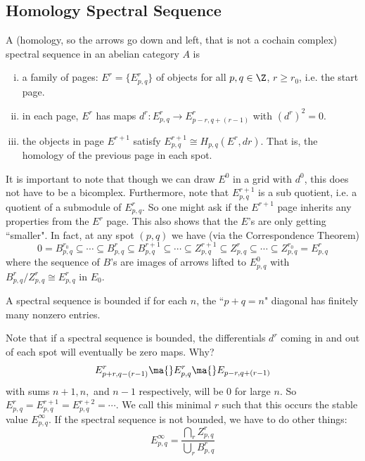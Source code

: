\subsection{Homology Spectral Sequence}

\begin{dfn}
A (homology, so the arrows go down and left, that is not a cochain complex) spectral sequence in an abelian category $A$ is 
\begin{enumerate}[(i)]
\item a family of pages: $E^r=\{E_{p,q}^r\}$ of objects for all $p,q \in \Z$, $r \geq r_0$, i.e. the start page.
\item in each page, $E^r$ has maps $d^r: E_{p,q}^r \to E_{p-r,q+(r-1)}^r$ with $(d^r)^2=0$.
\item the objects in page $E^{r+1}$ satisfy $E^{r+1}_{p,q} \cong H_{p,q}(E^r,dr)$. That is, the homology of the previous page in each spot. 
\end{enumerate}
\end{dfn}

It is important to note that though we can draw $E^0$ in a grid with $d^0$, this does not have to be a bicomplex. Furthermore, note that $E^{r+1}_{p,q}$ is a sub quotient, i.e. a quotient of a submodule of $E^r_{p,q}$. So one might ask if the $E^{r+1}$ page inherits any properties from the $E^r$ page. This also shows that the $E$'s are only getting ``smaller". In fact, at any spot $(p,q)$ we have (via the Correspondence Theorem)
\[
0=B^{r_0}_{p,q} \subseteq \cdots \subseteq B^r_{p,q} \subseteq B^{r+1}_{p,q} \subseteq \cdots \subseteq Z_{p,q}^{r+1} \subseteq Z^r_{p,q} \subseteq \cdots \subseteq Z_{p,q}^{r_0} = E_{p,q}^r
\]
where the sequence of $B$'s are images of arrows lifted to $E_{p,q}^0$ with $B^r_{p,q}/Z_{p,q}^r \cong E_{p,q}^r$ in $E_0$.

\begin{dfn}
A spectral sequence is bounded if for each $n$, the ``$p+q=n$" diagonal has finitely many nonzero entries. 
\end{dfn}

Note that if a spectral sequence is bounded, the differentials $d^r$ coming in and out of each spot will eventually be zero maps. Why?
\[
E_{p+r,q-(r-1)}^r \ma{} E_{p,q}^r \ma{} E_{p-r,q+(r-1)}
\]
with sums $n+1,n,$ and $n-1$ respectively, will be 0 for large $n$. So $E^r_{p,q}=E_{p,q}^{r+1}=E_{p,q}^{r+2}=\cdots$. We call this minimal $r$ such that this occurs the stable value $E^\infty_{p,q}$. If the spectral sequence is not bounded, we have to do other things:
\[
E^\infty_{p,q} = \frac{\bigcap_r Z^r_{p,q}}{\bigcup_r B^r_{p,q}}
\]

